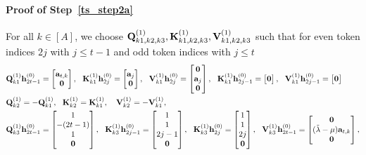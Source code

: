\paragraph{Proof of Step~\ref{ts_step2a}}
For all $k\in[A]$, we choose ${\mathbf Q}_{k1,k2,k3}^{(1)},{\mathbf K}_{k1,k2,k3}^{(1)},{\mathbf V}_{k1,k2,k3}^{(1)}$ such that for even token indices $2j$ with $j\leq t-1$ and odd token indices with $j\leq t$
\begin{align*}
    &\bQ^{(1)}_{k1}\bh^{(0)}_{2t-1}=\begin{bmatrix}
        \ba_{t,k} \\\bzero
    \end{bmatrix},~~ \bK^{(1)}_{k1}\bh^{(0)}_{2j}=\begin{bmatrix}
        \ba_{j}\\\bzero
    \end{bmatrix},~~\bV^{(1)}_{k1}\bh^{(0)}_{2j}=\begin{bmatrix}
       \bzero\\ \ba_j\\ \bzero
    \end{bmatrix},~~ \bK^{(1)}_{k1}\bh^{(0)}_{2j-1}=\begin{bmatrix}
      \bzero
\end{bmatrix},~~\bV^{(1)}_{k1}\bh^{(0)}_{2j-1}=\begin{bmatrix}
       \bzero
    \end{bmatrix}\\
    &
    \bQ^{(1)}_{k2}=-\bQ^{(1)}_{k1},~~  \bK^{(1)}_{k2}=\bK^{(1)}_{k1},~~  \ \bV^{(1)}_{k2}=-\bV^{(1)}_{k1},\\
    &
    \bQ^{(1)}_{k3}\bh^{(0)}_{2t-1}=\begin{bmatrix}
      1\\ -(2t-1)\\1\\\bzero
    \end{bmatrix},~~ \bK^{(1)}_{k3}\bh^{(0)}_{2j-1}=\begin{bmatrix}
      1\\  1\\ 2j-1\\\bzero
    \end{bmatrix},~~ 
    \bK^{(1)}_{k3}\bh^{(0)}_{2j}=\begin{bmatrix}
        1\\1\\  2j\\\bzero
    \end{bmatrix},~~ \bV^{(1)}_{k3}\bh^{(0)}_{2t-1}=\begin{bmatrix}
        \bzero\\ (\tilde\lambda-\prodeig)\ba_{t,k} \\ \bzero
    \end{bmatrix},
\end{align*}
